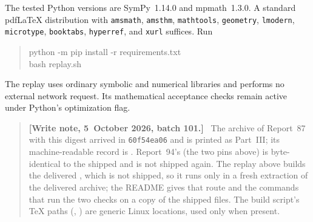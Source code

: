 \documentclass[11pt]{article}
\theoremstyle{remark}\newtheorem{remark}[theorem]{Remark}
\newenvironment{writenoteb}{\begin{quote}\small\raggedright\textbf{[Write note, 5~October 2026, batch 101.]}\ }{\end{quote}}
\begin{document}
The tested Python versions are SymPy~1.14.0 and mpmath~1.3.0. A standard pdf\LaTeX{} distribution with \texttt{amsmath}, \texttt{amsthm}, \texttt{mathtools}, \texttt{geometry}, \texttt{lmodern}, \texttt{microtype}, \texttt{booktabs}, \texttt{hyperref}, and \texttt{xurl} suffices. Run
\begin{quote}\ttfamily
python -m pip install -r requirements.txt\\
bash replay.sh
\end{quote}
The replay uses ordinary symbolic and numerical libraries and performs no external network request. Its mathematical acceptance checks remain active under Python's optimization flag.
\begin{writenoteb}
The archive of Report~87 with this digest arrived in \texttt{60f54ea06}
and is printed as Part~III; its machine-readable record is
. Report~94's
 (the two pins above) is byte-identical to the
shipped  and is not shipped again.
The replay above builds the delivered , which is not
shipped, so it runs only in a fresh extraction of the delivered archive;
the README gives that route and the commands that run the two checks on a
copy of the shipped files. The build script's TeX paths
(, ) are generic
Linux locations, used only when present.
\end{writenoteb}
\end{document}
